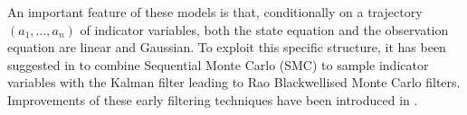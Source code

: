 An important feature of these models is that, conditionally on a trajectory $(a_1,\ldots,a_n)$ of indicator variables, both the state equation and the observation equation are linear and Gaussian. To exploit this specific structure, it has been suggested in \cite{chen:liu:2000,doucet:godsill:andrieu:2000} to combine Sequential Monte Carlo (SMC) to sample indicator variables with the Kalman filter leading to Rao Blackwellised Monte Carlo filters. %
Improvements of these early filtering techniques  have been introduced in \cite{doucet:gordon:krishnamurthy:2001,schon:gustafsson:nordlund:2005}. %
